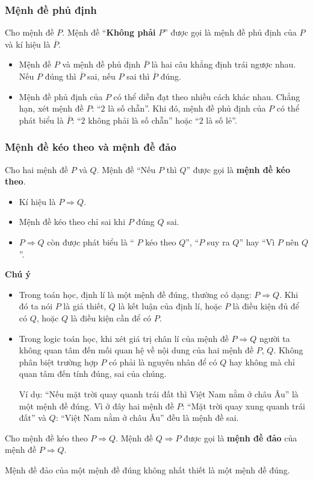 \subsubsection{Mệnh đề phủ định}
\begin{dn}
	Cho mệnh đề $P$. Mệnh đề ``\textbf{Không phải} $P$'' được gọi là mệnh đề phủ định của $P$ và kí hiệu là $\overline{P}$.
	\begin{itemize}
		\item Mệnh đề $P$ và mệnh đề phủ định $\overline{P}$ là hai câu khẳng định trái ngược nhau. Nếu $P$ đúng thì $\overline{P}$ sai, nếu $P$ sai thì $\overline{P}$ đúng.
		\item Mệnh đề phủ định của $P$ có thể diễn đạt theo nhiều cách khác nhau. Chẳng hạn, xét mệnh đề $P$: ``$2$ là số chẵn''. Khi đó, mệnh đề phủ định của $P$ có thể phát biểu là $\overline{P}$: ``$2$ không phải là số chẵn'' hoặc ``$2$ là số lẻ''.
	\end{itemize} 
\end{dn}
\subsubsection{Mệnh đề kéo theo và mệnh đề đảo}
\begin{dn}
	Cho hai mệnh đề $P$ và $Q$. Mệnh đề ``Nếu $P$ thì $Q$'' được gọi là \textbf{mệnh đề kéo theo}.
	\begin{itemize}
		\item  Kí hiệu là $P\Rightarrow Q.$
		\item Mệnh đề kéo theo chỉ sai khi $P$ đúng $Q$ sai.
		\item $P\Rightarrow Q$ còn được phát biểu là `` $P$ kéo theo $Q$'', ``$P$ suy ra $Q$'' hay ``Vì $P$ nên $Q$''.
	\end{itemize}
\end{dn}
\begin{note}
	\textbf{Chú ý}
	\begin{itemize}
		\item Trong toán học, định lí là một mệnh đề đúng, thường có dạng: $P\Rightarrow Q$.
		Khi đó ta nói $P$ là giả thiết, $Q$ là kết luận của định lí, hoặc $P$ là điều kiện đủ để có $Q$, hoặc $Q$ là điều kiện cần để có $P$.
		\item Trong logic toán học, khi xét giá trị chân lí của mệnh đề $P\Rightarrow Q$ người ta không quan tâm đến mối quan hệ về nội dung của hai mệnh đề $P$, $Q$. Không phân biệt trường hợp $P$ có phải là nguyên nhân để có $Q$ hay không mà chỉ quan tâm đến tính đúng, sai của chúng.
		
		Ví dụ: ``Nếu mặt trời quay quanh trái đất thì Việt Nam nằm ở châu Âu'' là một mệnh đề đúng. Vì ở đây hai mệnh đề $P$: ``Mặt trời quay xung quanh trái đất'' và $Q$: ``Việt Nam nằm ở châu Âu'' đều là mệnh đề sai.
	\end{itemize}
\end{note}
\begin{dn}
	Cho mệnh đề kéo theo $P\Rightarrow Q$. Mệnh đề $Q\Rightarrow P$ được gọi là \textbf{mệnh đề đảo} của mệnh đề $P\Rightarrow Q$.
\end{dn}
\begin{note}
	Mệnh đề đảo của một mệnh đề đúng không nhất thiết là một mệnh đề đúng.
\end{note}
